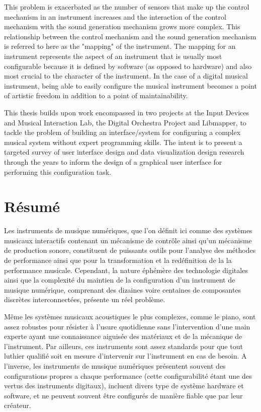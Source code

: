 \documentclass [12pt,letterpaper]{report}
\begin{document}
This problem is exacerbated as the number of sensors that make up the control mechanism in an instrument increases and the interaction of the control mechanism with the sound generation mechanism grows more complex. This relationship between the control mechanism and the sound generation mechanism is referred to here as the "mapping" of the instrument. The mapping for an instrument represents the aspect of an instrument that is usually most configurable because it is defined by software (as opposed to hardware) and also most crucial to the character of the instrument. In the case of a digital musical instrument, being able to easily configure the musical instrument becomes a point of artistic freedom in addition to a point of maintainability.

This thesis builds upon work encompassed in two projects at the Input Devices and Musical Interaction Lab, the Digital Orchestra Project and Libmapper, to tackle the problem of building an interface/system for configuring a complex musical system without expert programming skills. The intent is to present a targeted survey of user interface design and data visualization design research through the years to inform the design of a graphical user interface for performing this configuration task.

\section*{\centering R\'{e}sum\'{e}}

Les instruments de musique num\'{e}riques, que l'on d\'{e}finit ici comme des syst\`{e}mes musicaux interactifs contenant un m\'{e}canisme de contr\^{o}le ainsi qu'un m\'{e}canisme de production sonore, constituent de puissants outils pour l'analyse des m\'{e}thodes de performance ainsi que pour la transformation et la red\'{e}finition de la la performance musicale. Cependant, la nature \'{e}ph\'{e}m\`{e}re des technologie digitales ainsi que la complexit\'{e} du maintien de la configuration d'un instrument de musique num\'{e}rique, comprenant des dizaines voire centaines de composantes discr\`{e}tes interconnect\'{e}es, pr\'{e}sente un r\'{e}el probl\`{e}me. 

M\^{e}me les syst\`{e}mes musicaux acoustiques le plus complexes, comme le piano, sont assez robustes pour r\'{e}sister \`{a} l'usure quotidienne sans l'intervention d'une main experte ayant une connaissance aiguis\'{e}e des mat\'{e}riaux et de la m\'{e}canique de l'instrument. Par ailleurs, ces instruments sont assez standards pour que tout luthier qualifi\'{e} soit en mesure d'intervenir sur l'instrument en cas de besoin. A l'inverse, les instruments de musique num\'{e}riques pr\'{e}sentent souvent des configurations propres a chaque performance (cette configurabilit\'{e} \'{e}tant une des vertus des instruments digitaux), incluent divers type de syst\`{e}me hardware et software, et ne peuvent souvent \^{e}tre configur\'{e}s de mani\`{e}re fiable que par leur cr\'{e}ateur.
\end{document}
